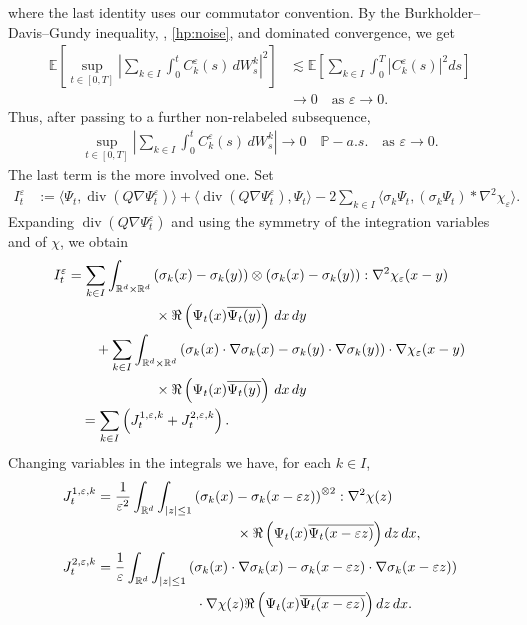 \documentclass[a4paper,10pt]{amsart}
\newcommand{\R}{\mathbb{R}}
\renewcommand{\epsilon}{\varepsilon}
\theoremstyle{remark}
\numberwithin{equation}{section}
\begin{document}
where the last identity uses our commutator convention. By the
Burkholder--Davis--Gundy inequality,
\cite[Lemma 4.2]{butori2026background}, \cref{hp:noise}, and dominated
convergence, we get
\begin{align*}
    \mathbb{E}\left[\sup_{t\in[0,T]}
    \left|\sum_{k\in I}\int_0^t C_k^\epsilon(s)\,dW^k_s\right|^2\right]
    &\lesssim \mathbb{E}\left[\sum_{k\in I}\int_0^T
    |C_k^\epsilon(s)|^2 ds\right] \\
    &\rightarrow 0\quad \mbox{as }\epsilon\rightarrow 0.
\end{align*}
Thus, after passing to a further non-relabeled subsequence,
\begin{align}\label{convergence_stoch_order_1}
    \sup_{t\in[0,T]}
    \left|\sum_{k\in I}\int_0^t C_k^\epsilon(s)\,dW^k_s\right|
    \rightarrow0\quad\mathbb{P}-a.s.
    \quad\mbox{as }\epsilon\rightarrow0.
\end{align}
The last term is the more involved one. Set
\begin{align*}
I^{\epsilon}_t &:=
\langle \Psi_t,\operatorname{div}(Q\nabla\Psi^{\epsilon}_t) \rangle
+\langle \operatorname{div}(Q\nabla\Psi^{\epsilon}_t),\Psi_t \rangle-2\sum_{k\in I}\langle \sigma_k\Psi_t,
\left(\sigma_k\Psi_t\right)\ast \nabla^2\chi_{\epsilon}\rangle.
\end{align*}
Expanding $\operatorname{div}(Q\nabla\Psi^{\epsilon}_t)$ and using the
symmetry of the integration variables and of $\chi$, we obtain
\begin{align*}
    I_t^\epsilon
    &=\sum_{k\in I }\int_{\R^d\times \R^d }
    \left(\sigma_k(x)-\sigma_k(y)\right)\otimes
    \left(\sigma_k(x)-\sigma_k(y)\right)
    :\nabla^2\chi_{\epsilon}(x-y)\\
    &\hspace{22mm}\times
    \Re\left(\Psi_t(x)\overline{\Psi_t(y)}\right)\,dx\,dy\\
    &\qquad+\sum_{k\in I }\int_{\R^d\times \R^d }
    \left(\sigma_k(x)\cdot\nabla\sigma_k(x)
    -\sigma_k(y)\cdot\nabla\sigma_k(y)\right)
    \cdot \nabla\chi_{\epsilon}(x-y)\\
    &\hspace{22mm}\times
    \Re\left(\Psi_t(x)\overline{\Psi_t(y)}\right)\,dx\,dy\\
    &\quad=\sum_{k\in I}\left(J^{1,\epsilon,k}_t+J^{2,\epsilon,k}_t\right).
\end{align*}
Changing variables in the integrals we have, for each $k\in I$, 
\begin{align*}
    J^{1,\epsilon,k}_t
    &=\frac{1}{\epsilon^{2}}\int_{\R^d}\int_{|z|\leq 1}
    \left(\sigma_k(x)-\sigma_k(x-\epsilon z)\right)^{\otimes2}
    :\nabla^2\chi(z)\\
    &\hspace{35mm}\times
    \Re\left(\Psi_t(x)\overline{\Psi_t(x-\epsilon z)}\right) dz\,dx,\\
    J^{2,\epsilon,k}_t
    &=\frac{1}{\epsilon}\int_{\R^d}\int_{|z|\leq 1}
    \left(\sigma_k(x)\cdot\nabla\sigma_k(x)
    -\sigma_k(x-\epsilon z)\cdot\nabla\sigma_k(x-\epsilon z)\right)\\
    &\hspace{25mm}\cdot\nabla\chi(z)
    \Re\left(\Psi_t(x)\overline{\Psi_t(x-\epsilon z)}\right)dz\,dx.
\end{align*}
\end{document}

